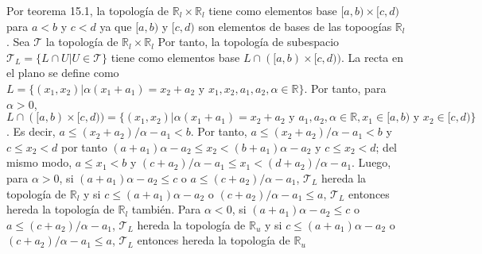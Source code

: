 \documentclass{article}
\begin{document}
Por teorema 15.1, la topología de $\mathbb{R}_l\times \mathbb{R}_l$ tiene como elementos base $[a,b)\times [c,d)$ para $a<b$ y $c<d$ ya que $[a,b)$ y $[c,d)$ son elementos de bases de las topoogías $\mathbb{R}_l$. Sea $\mathcal{T}$ la topología de $\mathbb{R}_l\times \mathbb{R}_l$ Por tanto, la topología de subespacio $\mathcal{T}_L=\{L\cap U| U\in \mathcal{T}\}$ tiene como elementos base $L\cap([a,b)\times[c,d))$. La recta en el plano se define como $L=\{(x_1,x_2)| \alpha (x_1+a_1)= x_2+a_2\text{ y }x_1,x_2,a_1,a_2,\alpha\in \mathbb{R}\}$. Por tanto, para $\alpha>0$, $L\cap([a,b)\times[c,d))=\{(x_1,x_2)|  \alpha (x_1+a_1)= x_2+a_2\text{ y }a_1,a_2,\alpha\in \mathbb{R},x_1\in [a,b)\text{ y }x_2\in [c,d)\}$. Es decir, $a\leq (x_2+a_2)/\alpha-a_1<b$. Por tanto,  $a\leq (x_2+a_2)/\alpha-a_1<b$ y $c\leq x_2<d$ por tanto  $(a+a_1)\alpha -a_2\leq x_2<(b+a_1)\alpha-a_2$ y $c\leq x_2<d$; del mismo modo, $a\leq x_1<b$ y $(c+a_2)/\alpha-a_1\leq x_1<(d+a_2)/\alpha-a_1$. Luego,  para $\alpha>0$, si $(a+a_1)\alpha -a_2\leq c$ o $a\leq(c+a_2)/\alpha-a_1$,  $\mathcal{T}_L$ hereda la topología de $\mathbb{R}_l$ y si $c\leq (a+a_1)\alpha -a_2$ o $(c+a_2)/\alpha-a_1\leq a$,  $\mathcal{T}_L$ entonces hereda la topología de $\mathbb{R}_l$ también. Para $\alpha<0$,  si $(a+a_1)\alpha -a_2\leq c$ o $a\leq(c+a_2)/\alpha-a_1$,  $\mathcal{T}_L$ hereda la topología de $\mathbb{R}_u$ y si $c\leq (a+a_1)\alpha -a_2$ o $(c+a_2)/\alpha-a_1\leq a$,  $\mathcal{T}_L$ entonces hereda la topología de $\mathbb{R}_u$
\end{document}
